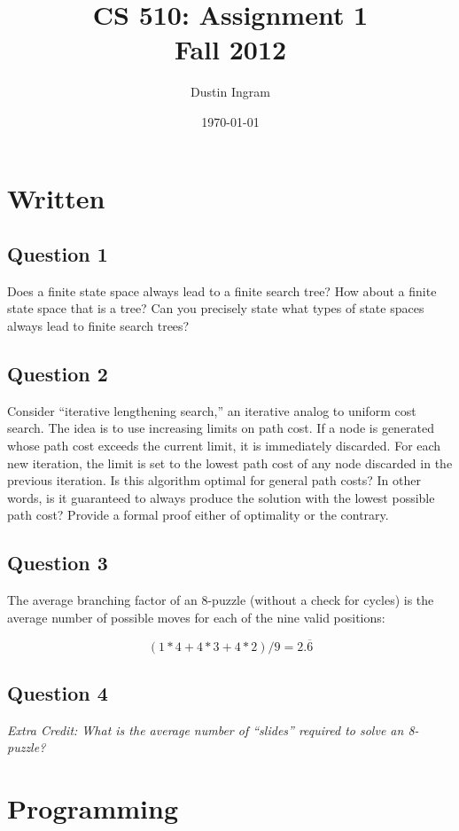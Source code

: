 \documentclass{article}
\title{CS 510: Assignment 1\\Fall 2012}
\author{Dustin Ingram}
\date{\today}
\begin{document}
\maketitle

\section{Written}

\subsection{Question 1}

Does a finite state space always lead to a finite search tree?  How about a
finite state space that is a tree? Can you precisely state what types of state
spaces always lead to finite search trees?

\subsection{Question 2}

Consider ``iterative lengthening search,'' an iterative analog to uniform cost
search.  The idea is to use increasing limits on path cost.  If a node is
generated whose path cost exceeds the current limit, it is immediately
discarded.  For each new iteration, the limit is set to the lowest path cost of
any node discarded in the previous iteration.  Is this algorithm optimal for
general path costs?  In other words, is it guaranteed to always produce the
solution with the lowest possible path cost?  Provide a formal proof either of
optimality or the contrary.

\subsection{Question 3}

The average branching factor of an 8-puzzle (without a check for cycles) is the
average number of possible moves for each of the nine valid positions:

$$ (1*4 + 4*3 + 4*2)/9 = 2.\overline{6} $$ 

\subsection{Question 4}

\emph{Extra Credit: What is the average number of ``slides'' required to solve
an 8-puzzle?}

\section{Programming}
\end{document}
